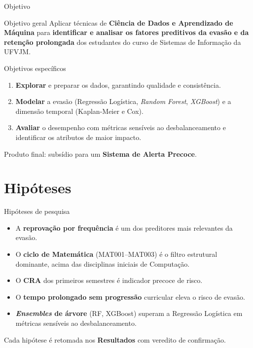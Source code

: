 \documentclass[aspectratio=169,11pt,brazil]{beamer}
\begin{document}
\begin{frame}{Objetivo}
  \begin{block}{Objetivo geral}
    Aplicar técnicas de \textbf{Ciência de Dados e Aprendizado de Máquina} para \textbf{identificar e analisar os fatores preditivos da evasão e da retenção prolongada} dos estudantes do curso de Sistemas de Informação da UFVJM.
  \end{block}
  \begin{block}{Objetivos específicos}
    \begin{enumerate}
      \item \textbf{Explorar} e preparar os dados, garantindo qualidade e consistência.
      \item \textbf{Modelar} a evasão (Regressão Logística, \emph{Random Forest}, \emph{XGBoost}) e a dimensão temporal (Kaplan-Meier e Cox).
      \item \textbf{Avaliar} o desempenho com métricas sensíveis ao desbalanceamento e identificar os atributos de maior impacto.
    \end{enumerate}
  \end{block}
  \centering\small Produto final: subsídio para um \textbf{Sistema de Alerta Precoce}.
\end{frame}

\section{Hipóteses}

\begin{frame}{Hipóteses de pesquisa}
  \begin{itemize}
    \item[\textbf{H1}] A \textbf{reprovação por frequência} é um dos preditores mais relevantes da evasão.
    \item[\textbf{H2}] O \textbf{ciclo de Matemática} (MAT001--MAT003) é o filtro estrutural dominante, acima das disciplinas iniciais de Computação.
    \item[\textbf{H3}] O \textbf{CRA} dos primeiros semestres é indicador precoce de risco.
    \item[\textbf{H4}] O \textbf{tempo prolongado sem progressão} curricular eleva o risco de evasão.
    \item[\textbf{H5}] \textbf{\emph{Ensembles} de árvore} (RF, XGBoost) superam a Regressão Logística em métricas sensíveis ao desbalanceamento.
  \end{itemize}
  \vfill
  \centering\small Cada hipótese é retomada nos \textbf{Resultados} com veredito de confirmação.
\end{frame}
\end{document}

